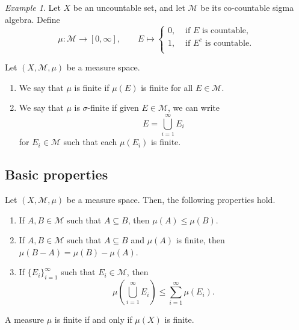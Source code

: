 \documentclass[11pt]{article}
\newcommand{\M}{\mathcal{M}}
\theoremstyle{definition}
\theoremstyle{remark}
\newtheorem*{example}{Example}
\numberwithin{equation}{section}
\begin{document}
    \begin{example}
        Let $X$ be an uncountable set, and let $\M$ be its co-countable sigma
        algebra. Define \[
            \mu\colon \M \to [0, \infty], \qquad E \mapsto \begin{cases}
                0, &\text{ if } E \text{ is countable},\\
                1, &\text{ if } E^c \text{ is countable}.\\
            \end{cases}
        \] 
    \end{example}


    \begin{definition}
        Let $(X, \M, \mu)$ be a measure space. \begin{enumerate}
            \itemsep0em
            \item We say that $\mu$ is finite if $\mu(E)$ is finite for all $E \in
            \M$.
            \item We say that $\mu$ is $\sigma$-finite if given $E \in \M$, we
            can write \[
                E = \bigcup_{i = 1}^\infty E_i
            \] for $E_i \in \M$ such that each $\mu(E_i)$ is finite.
        \end{enumerate}
    \end{definition}


    \subsection{Basic properties}

    \begin{lemma}
        Let $(X, \M, \mu)$ be a measure space. Then, the following properties
        hold. \begin{enumerate}
            \itemsep0em
            \item If $A, B \in \M$ such that $A \subseteq B$, then $\mu(A) \leq
            \mu(B)$.
            \item If $A, B \in \M$ such that $A \subseteq B$ and $\mu(A)$ is
            finite, then $\mu(B - A) = \mu(B) - \mu(A)$.
            \item If $\{E_i\}_{i = 1}^\infty$ such that $E_i \in \M$, then \[
                \mu\left(\bigcup_{i = 1}^\infty E_i\right) \leq \sum_{i = 1}^\infty
                \mu(E_i).
            \] 
        \end{enumerate}
    \end{lemma}

    \begin{corollary}
        A measure $\mu$ is finite if and only if $\mu(X)$ is finite.
    \end{corollary}
\end{document}
